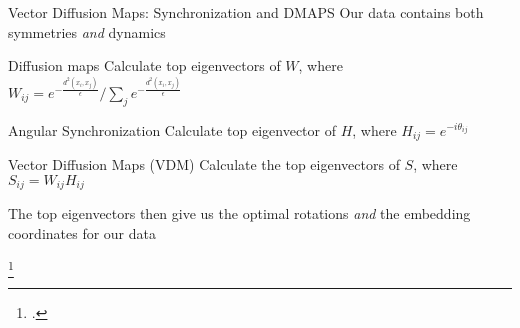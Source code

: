 \begin{frame}{Vector Diffusion Maps: Synchronization and DMAPS}
	Our data contains both symmetries {\em and} dynamics
	
	\begin{minipage}{0.45\textwidth}
	\begin{block}{Diffusion maps}
		Calculate top eigenvectors of $W$, where $W_{ij} = e^{-\frac{d^2(x_i, x_j)}{\epsilon}} / \sum_j e^{-\frac{d^2(x_i, x_j)}{\epsilon}} $
	\end{block}
	\end{minipage}	
	\hfill
	\begin{minipage}{0.45\textwidth}	
	\begin{block}{Angular Synchronization}
		Calculate top eigenvector of $H$, where $H_{ij} = e^{-i \theta_{ij}}$
	\end{block}
	\end{minipage}
	
	\begin{block}{Vector Diffusion Maps (VDM) \footnotemark} 
		Calculate the top eigenvectors of $S$, where $S_{ij} = W_{ij}H_{ij}$
		
		The top eigenvectors then give us the optimal rotations {\em and} the embedding coordinates for our data
	\end{block}
	\footcitetext{singer2012vector}

	\vspace{-0.2in}
	

\end{frame}